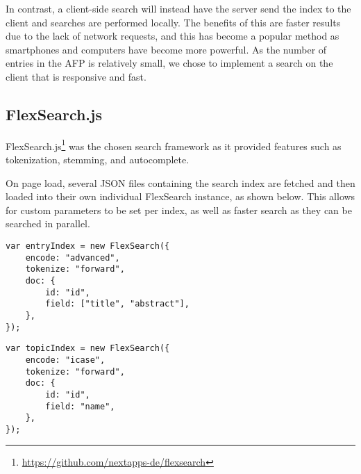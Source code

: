 \documentclass[bsc,frontabs,oneside,singlespacing,parskip,deptreport,logo]{infthesis}
\newcommand{\jtodo}[2][]{\todo[color=yellow!70,#1]{\footnotesize JF: #2}}
\newcommand{\cit}{\jtodo{Citation needed.}}
\begin{document}
In contrast, a client-side search will instead have the server send the index to the client and searches are performed locally. The benefits of this are faster results due to the lack of network requests, and this has become a popular method as smartphones and computers have become more powerful. As the number of entries in the AFP is relatively small, we chose to implement a search on the client that is responsive and fast.

\subsection{FlexSearch.js}

FlexSearch.js\footnote{\url{https://github.com/nextapps-de/flexsearch}} was the chosen search framework as it provided features such as tokenization, stemming, and autocomplete. 

On page load, several JSON files containing the search index are fetched and then loaded into their own individual FlexSearch instance, as shown below. This allows for custom parameters to be set per index, as well as faster search as they can be searched in parallel.

\begin{minipage}[t]{0.47\textwidth}
{\footnotesize
\begin{verbatim}
var entryIndex = new FlexSearch({
    encode: "advanced",
    tokenize: "forward",
    doc: {
        id: "id",
        field: ["title", "abstract"],
    },
});
\end{verbatim}
}
\end{minipage}\hfill
\begin{minipage}[t]{0.47\textwidth}
{\footnotesize
\begin{verbatim}
var topicIndex = new FlexSearch({
    encode: "icase",
    tokenize: "forward",
    doc: {
        id: "id",
        field: "name",
    },
});
\end{verbatim}
}
\end{minipage}




\end{document}
